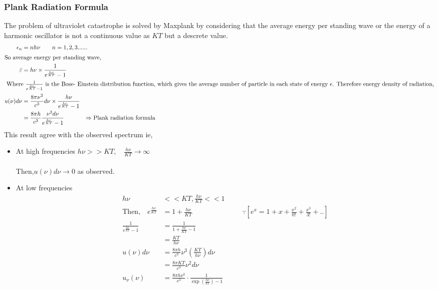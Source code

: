   \subsubsection{Plank Radiation Formula}
  The problem of ultraviolet catastrophe is solved by Maxplank by considering that the average energy per standing wave or the energy of a harmonic oscillator is not a continuous value as $KT$ but a descrete value.
  \begin{align*}
  \epsilon_{n}&=n h \nu \qquad n=1,2,3......\\
  \intertext{So average energy per standing wave,}\quad\bar{\varepsilon}&=h \nu \times \frac{1}{e^\frac{h\nu}{KT}-1}\\
  \intertext{ Where $\frac{1}{e^{\frac{h \nu}{KT}}-1}$  is the Bose- Einstein distribution function, which gives the average number of particle in each state of energy $\epsilon$. Therefore energy density of radiation,}
  u(\nu) d \nu&=\frac{8 \pi \nu^{2}}{c^{3}} d \nu \times \frac{h \nu}{e^{\frac{h\nu}{KT}}-1}\\
  &=\frac{8 \pi h}{c^{3}} \frac{\nu^{3} d \nu}{e^{\frac{h\nu}{KT}}-1} \qquad \hspace{0.5cm}\Rightarrow\text{Plank radiation formula}
  \end{align*}
  This result agree with the observed spectrum ie,
  \begin{itemize}
  	\item At high frequencies \quad $h\nu>>KT,\quad\frac{h\nu}{KT} \rightarrow\infty$\\\\ Then,\quad $u(\nu) d \nu \rightarrow 0$ \quad  as observed. 
  	\item At low frequencies
  	\begin{align*}
  	h\nu&<<KT,\frac{h\nu}{KT}<<1\\
  	\text{Then,}\quad e^\frac{h\nu}{KT}&=1+\frac{h\nu}{KT}\hspace{3cm}\because\left[ e^x=1+x+\frac{x^2}{0!}+\frac{x^3}{3!}+.. \right]\\
  	\frac{1}{e^\frac{h\nu}{KT}-1}&=\frac{1}{1+\frac{h\nu}{KT}-1}\\&=\frac{KT}{h\nu}\\
  	u(\nu) d \nu&=\frac{8 \pi h}{c^{3}} \nu^{3}\left(\frac{KT}{h\nu}\right) d \nu\\&=\frac{8 \pi KT }{c^3} \nu^{2} d \nu\\
  	u_{\nu}(\nu)&=\frac{8 \pi h \nu^{3}}{c^{3}} \cdot \frac{1}{\exp \left(\frac{h \nu}{k T}\right)-1}
  	\end{align*}
  	
  \end{itemize}
